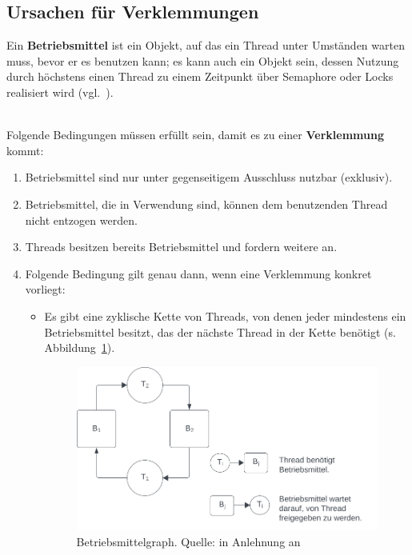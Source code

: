 \subsection{Ursachen für Verklemmungen}\label{sec:deadlockreason}

\begin{tcolorbox}[enlarge top by=0.5cm,enlarge bottom by=0.5cm]
    Ein \textbf{Betriebsmittel} ist ein Objekt, auf das ein Thread unter Umständen warten muss, bevor er es benutzen kann; es kann auch ein Objekt sein, dessen Nutzung durch höchstens einen Thread zu einem Zeitpunkt über Semaphore oder Locks realisiert wird (vgl.~\cite[186]{Oec22}).
\end{tcolorbox}\\

\noindent
Folgende Bedingungen müssen erfüllt sein, damit es zu einer \textbf{Verklemmung} kommt:

\begin{enumerate}
    \item Betriebsmittel sind nur unter gegenseitigem Ausschluss nutzbar (exklusiv).
    \item Betriebsmittel, die in Verwendung sind, können dem benutzenden Thread nicht entzogen werden.
    \item Threads besitzen bereits Betriebsmittel und fordern weitere an.
    \item Folgende Bedingung gilt genau dann, wenn eine Verklemmung konkret vorliegt:
    \begin{itemize}
        \item[] Es gibt eine zyklische Kette von Threads, von denen jeder mindestens ein Betriebsmittel besitzt, das der nächste Thread in der Kette benötigt (s. Abbildung~\ref{fig:cyclic}).
         \begin{figure}
            \centering
            \includegraphics[scale=0.5]{chapters/fopt2/img/cyclic}
            \caption{Betriebsmittelgraph. Quelle: in Anlehnung an \cite[192, Bild 3.9]{Oec22}}
            \label{fig:cyclic}
        \end{figure}
    \end{itemize}
\end{enumerate}


